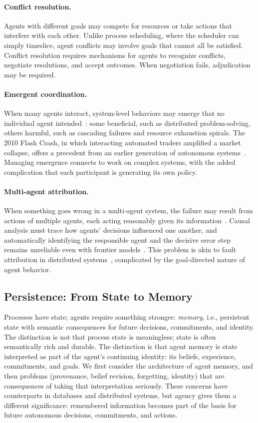 \documentclass[11pt]{article}
\begin{document}
\paragraph{Conflict resolution.} Agents with different goals may compete for resources or take actions that interfere with each other. Unlike process scheduling, where the scheduler can simply timeslice, agent conflicts may involve goals that cannot all be satisfied. Conflict resolution requires mechanisms for agents to recognize conflicts, negotiate resolutions, and accept outcomes. When negotiation fails, adjudication may be required.

\paragraph{Emergent coordination.} When many agents interact, system-level behaviors may emerge that no individual agent intended~\cite{park_generative}: some beneficial, such as distributed problem-solving, others harmful, such as cascading failures and resource exhaustion spirals. The 2010 Flash Crash, in which interacting automated traders amplified a market collapse, offers a precedent from an earlier generation of autonomous systems~\cite{kirilenko_flash}. Managing emergence connects to work on complex systems, with the added complication that each participant is generating its own policy.

\paragraph{Multi-agent attribution.} When something goes wrong in a multi-agent system, the failure may result from actions of multiple agents, each acting reasonably given its information~\cite{cemri_mas_fail}. Causal analysis must trace how agents' decisions influenced one another, and automatically identifying the responsible agent and the decisive error step remains unreliable even with frontier models~\cite{zhang_failure_attribution}. This problem is akin to fault attribution in distributed systems~\cite{lamport_time}, complicated by the goal-directed nature of agent behavior.

\subsection{Persistence: From State to Memory}

Processes have state; agents require something stronger: \textit{memory}, i.e., persistent state with semantic consequences for future decisions, commitments, and identity. The distinction is not that process state is meaningless; state is often semantically rich and durable. The distinction is that agent memory is state interpreted as part of the agent's continuing identity: its beliefs, experience, commitments, and goals. We first consider the architecture of agent memory, and then problems (provenance, belief revision, forgetting, identity) that are consequences of taking that interpretation seriously. These concerns have counterparts in databases and distributed systems, but agency gives them a different significance: remembered information becomes part of the basis for future autonomous decisions, commitments, and actions.
\end{document}
